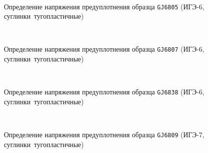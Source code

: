 \begin{figure}[ht]
    {\centering
      \def\svgwidth{11.8cm} %
      \small
      \hfill 
      \\
      \hfill  
      \def\svgwidth{11.7cm}
      \hfill 
      }
      \caption{Определение напряжения предуплотнения образца \texttt{GJ6805} (ИГЭ-6, суглинки тугопластичные)}
      \label{img:6805}
    \end{figure}
    
    \begin{figure}
        {\centering
        \small
          \hfill 
          \\
          \hfill  
          \hfill 
          }
          \caption{Определение напряжения предуплотнения образца \texttt{GJ6807} (ИГЭ-6, суглинки тугопластичные)}
          \label{img:6807}
    \end{figure}
    
    \begin{figure}
        {\centering
        \small
            \hfill 
            \\
            \hfill  
            \hfill 
            }
            \caption{Определение напряжения предуплотнения образца \texttt{GJ6838} (ИГЭ-6, суглинки тугопластичные)}
            \label{img:6838}
    \end{figure}
    
    
    \begin{figure}
        {\centering
        \small
            \hfill 
            \\
            \hfill  
            \hfill 
            }
            \caption{Определение напряжения предуплотнения образца \texttt{GJ6809} (ИГЭ-7, суглинки тугопластичные)}
            \label{img:6809}
    \end{figure}
    

